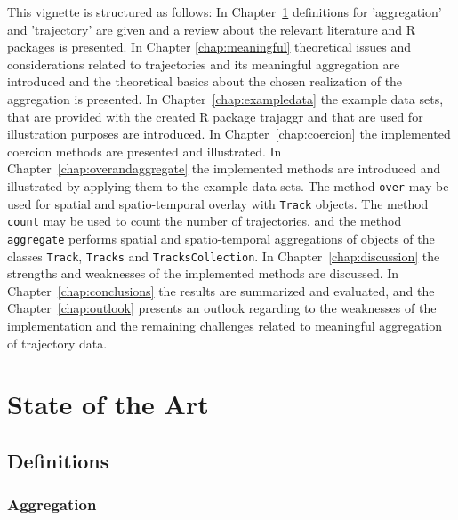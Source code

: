 \documentclass[12pt, oneside, a4paper]{scrbook}
\newcommand{\pkg}[1]{{\normalfont\fontseries{b}\selectfont #1}}
\let\proglang=\textsf
\let\code=\texttt
\begin{document}
This vignette is structured as follows: In Chapter~\ref{chap:stateoftheart} definitions for 'aggregation' and 'trajectory' are given and a review about the relevant literature and \proglang{R} packages is presented. In Chapter \ref{chap:meaningful} theoretical issues and considerations related to trajectories and its meaningful aggregation are introduced and the theoretical basics about the chosen realization of the aggregation is presented. In Chapter~\ref{chap:exampledata} the example data sets, that are provided with the created \proglang{R} package \pkg{trajaggr} and that are used for illustration purposes are introduced. In Chapter~\ref{chap:coercion} the implemented coercion methods are presented and illustrated. In Chapter~\ref{chap:overandaggregate} the implemented methods are introduced and illustrated by applying them to the example data sets. The method \code{over} may be used for spatial and spatio-temporal overlay with \code{Track} objects. The method \code{count} may be used to count the number of trajectories, and the method \code{aggregate} performs spatial and spatio-temporal aggregations of objects of the classes \code{Track}, \code{Tracks} and \code{TracksCollection}. In Chapter~\ref{chap:discussion} the strengths and weaknesses of the implemented methods are discussed. In Chapter~\ref{chap:conclusions} the results are summarized and evaluated, and the Chapter~\ref{chap:outlook} presents an outlook regarding to the weaknesses of the implementation and the remaining challenges related to meaningful aggregation of trajectory data.
\par\medskip




\chapter{State of the Art}
\label{chap:stateoftheart}

\section{Definitions}
\label{sec:definitions}

\subsection*{Aggregation}
\end{document}
